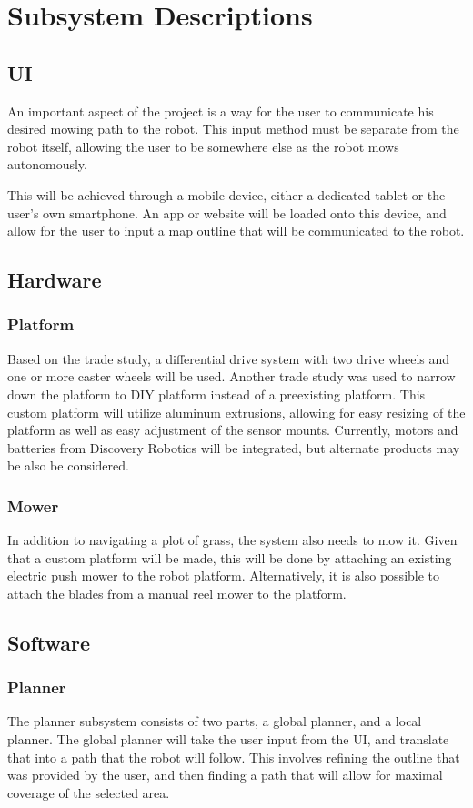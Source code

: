 \documentclass{article}
\begin{document}
\section{Subsystem Descriptions}
	\subsection{UI}
	An important aspect of the project is a way for the user to communicate his desired mowing path to the robot. This input method must be separate from the robot itself, allowing the user to be somewhere else as the robot mows autonomously. 
	
	This will be achieved through a mobile device, either a dedicated tablet or the user's own smartphone. An app or website will be loaded onto this device, and allow for the user to input a map outline that will be communicated to the robot. 
	
	\subsection{Hardware}
		\subsubsection{Platform}
			Based on the trade study, a differential drive system with two drive wheels and one or more caster wheels will be used. Another trade study was used to narrow down the platform to DIY platform instead of a preexisting platform. This custom platform will utilize aluminum extrusions, allowing for easy resizing of the platform as well as easy adjustment of the sensor mounts. Currently, motors and batteries from Discovery Robotics will be integrated, but alternate products may be also be considered. 
			
		\subsubsection{Mower}
			In addition to navigating a plot of grass, the system also needs to mow it. Given that a custom platform will be made, this will be done by attaching an existing electric push mower to the robot platform. Alternatively, it is also possible to attach the blades from a manual reel mower to the platform. 
	
	\subsection{Software}
		\subsubsection{Planner}
			The planner subsystem consists of two parts, a global planner, and  a local planner. The global planner will take the user input from the UI, and translate that into a path that the robot will follow. This involves refining the outline that was provided by the user, and then finding a path that will allow for maximal coverage of the selected area. 
			
\end{document}
